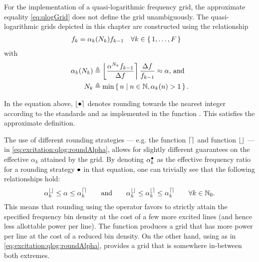   \begin{definition}
  For the implementation of a quasi-logarithmic frequency grid,  the approximate equality \eqref{eq:qlogGrid} does not define the grid unambiguously.
  The quasi-logarithmic grids depicted in this chapter are constructed using the relationship
  \begin{align}
       \label{eq:excitation:qlog:gridDef}
    f_k & = \alpha_k(N_k) f_{k-1}  
        \quad
            \forall k \in \set{1,\ldots,F}
\end{align}
with
\begin{align}
     \label{eq:excitation:qlog:roundAlpha}
      \alpha_k(N_k) & \triangleq 
          \left\lfloor    \frac{\alpha^{N_k} f_{k-1}}{\Delta f} \right\rceil    
           \frac{\Delta f}{f_{k-1}}
      \approx \alpha \text{, and}\\
         \label{eq:excitation:qlog:alphaPowerDef}
          N_k & \triangleq 
            \min 
            \set{n | n \in \ensuremath{\mathbb{N}}, \alpha_k(n) > 1}
     \text{.}
  \end{align}
  \end{definition}
  In the equation above, $\left\lfloor \bullet \right\rceil$ denotes rounding towards the nearest integer according to the \IEEEfloat standards and as implemented in the \MATLAB function .
  This satisfies the approximate definition.
  
  \begin{remark}
  The use of different rounding strategies --- e.g. the  function $\left\lceil  \right\rceil$  and  function $\left\lfloor  \right\rfloor$ --- in \eqref{eq:excitation:qlog:roundAlpha}, allows for slightly different guarantees on the effective $\alpha_k$ attained by the grid.
  By denoting $\alpha_k^{\bullet}$ as the effective frequency ratio for a rounding strategy $\bullet$  in that equation, one can trivially see that the following relationships hold:
  \begin{equation}
  \alpha_k^{\left\lfloor  \right\rfloor} \leq \alpha \leq  \alpha_k^{\left\lceil  \right\rceil}
  \qquad \text{and} \qquad
  \alpha_k^{\left\lfloor  \right\rfloor} \leq \alpha_k^{\left\lfloor  \right\rceil} \leq  \alpha_k^{\left\lceil  \right\rceil}
  \qquad
  \forall k \in \mathbb{N}_{0}
  \text{.}
  \end{equation}
  This means that rounding using the  operator favors to strictly attain the specified frequency bin density at the cost of a few more excited lines (and hence less allottable power per line).
  The  function produces a grid that has more power per line at the cost of a reduced bin density.
  On the other hand, using  as in \eqref{eq:excitation:qlog:roundAlpha}, provides a grid that is somewhere in-between both extremes.
  \end{remark}

